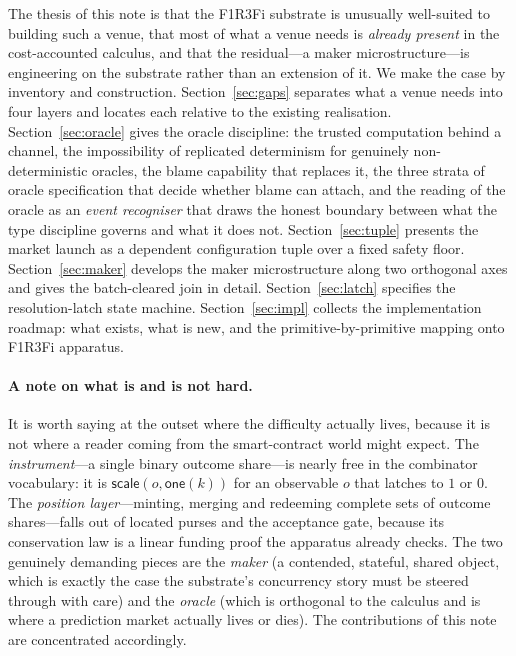 \documentclass[11pt]{article}
\begin{document}
The thesis of this note is that the F1R3Fi substrate is unusually well-suited to building
such a venue, that most of what a venue needs is \emph{already present} in the
cost-accounted calculus, and that the residual---a maker microstructure---is engineering on
the substrate rather than an extension of it. We make the case by inventory and construction.
Section~\ref{sec:gaps} separates what a venue needs into four layers and locates each
relative to the existing realisation. Section~\ref{sec:oracle} gives the oracle discipline:
the trusted computation behind a channel, the impossibility of replicated determinism for
genuinely non-deterministic oracles, the blame capability that replaces it, the three strata
of oracle specification that decide whether blame can attach, and the reading of the oracle
as an \emph{event recogniser} that draws the honest boundary between what the type discipline
governs and what it does not. Section~\ref{sec:tuple} presents the market launch as a
dependent configuration tuple over a fixed safety floor. Section~\ref{sec:maker} develops the
maker microstructure along two orthogonal axes and gives the batch-cleared join in detail.
Section~\ref{sec:latch} specifies the resolution-latch state machine. Section~\ref{sec:impl}
collects the implementation roadmap: what exists, what is new, and the primitive-by-primitive
mapping onto F1R3Fi apparatus.

\paragraph{A note on what is and is not hard.} It is worth saying at the outset where the
difficulty actually lives, because it is not where a reader coming from the smart-contract
world might expect. The \emph{instrument}---a single binary outcome share---is nearly free in
the combinator vocabulary: it is $\textsf{scale}(o,\textsf{one}(k))$ for an observable $o$
that latches to $1$ or $0$. The \emph{position layer}---minting, merging and redeeming
complete sets of outcome shares---falls out of located purses and the acceptance gate,
because its conservation law is a linear funding proof the apparatus already checks. The two
genuinely demanding pieces are the \emph{maker} (a contended, stateful, shared object, which
is exactly the case the substrate's concurrency story must be steered through with care) and
the \emph{oracle} (which is orthogonal to the calculus and is where a prediction market
actually lives or dies). The contributions of this note are concentrated accordingly.
\end{document}
